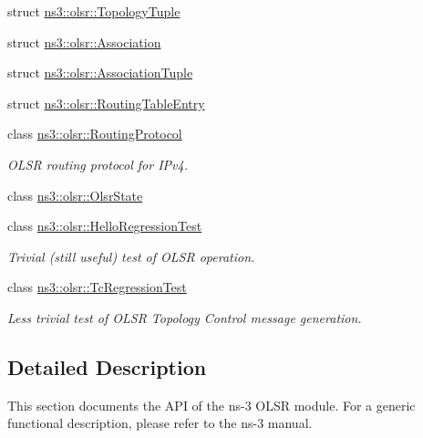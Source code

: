 \begin{DoxyCompactItemize}
struct \hyperlink{structns3_1_1olsr_1_1TopologyTuple}{ns3\+::olsr\+::\+Topology\+Tuple}
\item 
struct \hyperlink{structns3_1_1olsr_1_1Association}{ns3\+::olsr\+::\+Association}
\item 
struct \hyperlink{structns3_1_1olsr_1_1AssociationTuple}{ns3\+::olsr\+::\+Association\+Tuple}
\item 
struct \hyperlink{structns3_1_1olsr_1_1RoutingTableEntry}{ns3\+::olsr\+::\+Routing\+Table\+Entry}
\item 
class \hyperlink{classns3_1_1olsr_1_1RoutingProtocol}{ns3\+::olsr\+::\+Routing\+Protocol}
\begin{DoxyCompactList}\small\item\em O\+L\+SR routing protocol for I\+Pv4. \end{DoxyCompactList}\item 
class \hyperlink{classns3_1_1olsr_1_1OlsrState}{ns3\+::olsr\+::\+Olsr\+State}
\item 
class \hyperlink{classns3_1_1olsr_1_1HelloRegressionTest}{ns3\+::olsr\+::\+Hello\+Regression\+Test}
\begin{DoxyCompactList}\small\item\em Trivial (still useful) test of O\+L\+SR operation. \end{DoxyCompactList}\item 
class \hyperlink{classns3_1_1olsr_1_1TcRegressionTest}{ns3\+::olsr\+::\+Tc\+Regression\+Test}
\begin{DoxyCompactList}\small\item\em Less trivial test of O\+L\+SR Topology Control message generation. \end{DoxyCompactList}\end{DoxyCompactItemize}


\subsection{Detailed Description}
This section documents the A\+PI of the ns-\/3 O\+L\+SR module. For a generic functional description, please refer to the ns-\/3 manual. 